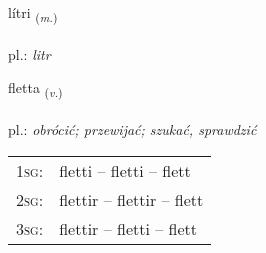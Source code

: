 \documentclass[frontgrid, backgrid]{flacards}\usepackage[]{graphicx}\usepackage[]{xcolor}
\begin{document}
\renewcommand{\flhead}{\vskip5pt \fboxsep=0pt {\small\bfseries\footnotesize Nafnorð | rzeczownik}}
\renewcommand{\fcfoot}{\vskip5pt \fboxsep=0pt \hspace{2pt}{\small\bfseries\footnotesize 3K}}

\renewcommand{\blhead}{\vskip5pt {\small\bfseries\footnotesize Nafnorð | rzeczownik }}
\renewcommand{\bcfoot}{\vskip5pt \hspace{2pt}{\small\bfseries\footnotesize 3K}}


{lítri \small{\textsubscript{(\textit{m.})}} \\[1ex] %
\textphonetic{[liːtrɪ]} \\
pl.: \emph{litr} \\  [2ex]
\renewcommand*{\arraystretch}{0.8}
}

\renewcommand{\flhead}{\vskip5pt \fboxsep=0pt {\small\bfseries\footnotesize Sagnorð | czasownik}}
\renewcommand{\fcfoot}{\vskip5pt \fboxsep=0pt \hspace{2pt}{\small\bfseries\footnotesize 3K}}

\renewcommand{\blhead}{\vskip5pt {\small\bfseries\footnotesize Sagnorð | czasownik }}
\renewcommand{\bcfoot}{\vskip5pt \hspace{2pt}{\small\bfseries\footnotesize 3K}}


{fletta \small{\textsubscript{(\textit{v.})}} \\[1ex] %
\textphonetic{[flɛhta]} \\
pl.: \emph{obrócić; przewijać; szukać, sprawdzić} \\  [2ex]
\renewcommand*{\arraystretch}{0.8}
\begin{tabular}{p{1cm}l}
\textsc{1sg}: & fletti -- fletti -- flett \\ 
\textsc{2sg}: & flettir -- flettir -- flett \\ 
\textsc{3sg}: & flettir -- fletti -- flett \\ 
\end{tabular}
}
\end{document}
